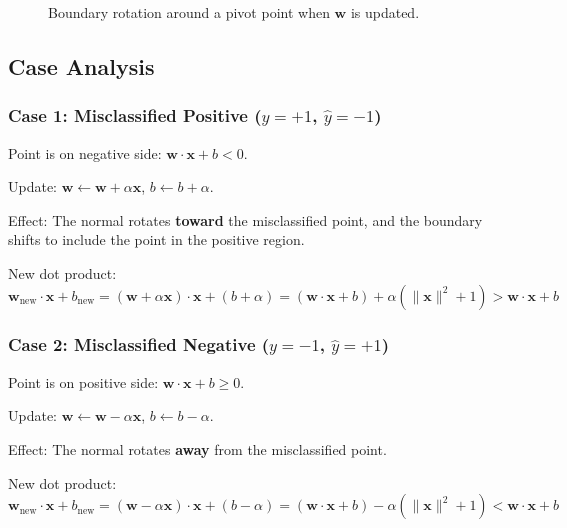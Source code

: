 \begin{notechapter}
\begin{figure}[H]
\caption{Boundary rotation around a pivot point when $\mathbf{w}$ is updated.}
\end{figure}

\subsection{Case Analysis}

\subsubsection{Case 1: Misclassified Positive ($y=+1$, $\hat{y}=-1$)}

Point is on negative side: $\mathbf{w} \cdot \mathbf{x} + b < 0$.

Update: $\mathbf{w} \leftarrow \mathbf{w} + \alpha \mathbf{x}$, $b \leftarrow b + \alpha$.

Effect: The normal rotates \textbf{toward} the misclassified point, and the boundary shifts to include the point in the positive region.

New dot product:
\[
\mathbf{w}_{\text{new}} \cdot \mathbf{x} + b_{\text{new}} = (\mathbf{w} + \alpha \mathbf{x}) \cdot \mathbf{x} + (b + \alpha) = (\mathbf{w} \cdot \mathbf{x} + b) + \alpha(\|\mathbf{x}\|^2 + 1) > \mathbf{w} \cdot \mathbf{x} + b
\]

\subsubsection{Case 2: Misclassified Negative ($y=-1$, $\hat{y}=+1$)}

Point is on positive side: $\mathbf{w} \cdot \mathbf{x} + b \geq 0$.

Update: $\mathbf{w} \leftarrow \mathbf{w} - \alpha \mathbf{x}$, $b \leftarrow b - \alpha$.

Effect: The normal rotates \textbf{away} from the misclassified point.

New dot product:
\[
\mathbf{w}_{\text{new}} \cdot \mathbf{x} + b_{\text{new}} = (\mathbf{w} - \alpha \mathbf{x}) \cdot \mathbf{x} + (b - \alpha) = (\mathbf{w} \cdot \mathbf{x} + b) - \alpha(\|\mathbf{x}\|^2 + 1) < \mathbf{w} \cdot \mathbf{x} + b
\]


\end{notechapter}
